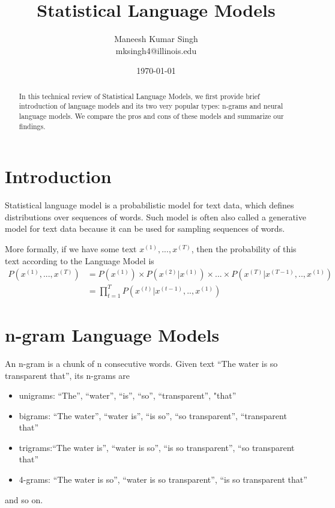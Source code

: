 \documentclass[letterpaper]{article}
\begin{document}
\title{\vspace{-2.0cm}\textbf{Statistical Language Models}}
\author{Maneesh Kumar Singh \\ \small mksingh4@illinois.edu}
\date{\today}
\maketitle

\begin{abstract}
	In this technical review of Statistical Language Models, we first
provide brief introduction of language models and its two very popular
types: n-grams and neural language models. We compare the pros and cons
of these models and summarize our findings.
\end{abstract}

\section{Introduction}
Statistical language model is a probabilistic model for text data,
which defines distributions over sequences of words. Such model is 
often also called a generative model for text data because it can be
used for sampling sequences of words.

More formally, if we have some text $x^{(1)},...,x^{(T)}$, then the 
probability of this text according to the Language Model is
\begin{align}
	P(x^{(1)},...,x^{(T)}) &= P(x^{(1)}) \times P(x^{(2)}|x^{(1)}) \times ... \times P(x^{(T)}|x^{(T-1)},..,x^{(1)}) \\
	&= \prod_{t=1}^T P(x^{(t)}|x^{(t-1)},..,x^{(1)})
\end{align}

\section{n-gram Language Models}
An n-gram is a chunk of n consecutive words. Given text 
``The water is so transparent that'', its n-grams are
\begin{itemize}
	\setlength\itemsep{0em}
	\item unigrams: ``The'', ``water'', ``is'', ``so'', ``transparent'', "that''
	\item bigrams: ``The water'', ``water is'', ``is so'', ``so transparent'', ``transparent that''
	\item trigrams:``The water is'', ``water is so'', ``is so transparent'', ``so transparent that''
	\item 4-grams: ``The water is so'', ``water is so transparent'', ``is so transparent that''
\end{itemize} and so on.
\end{document}
